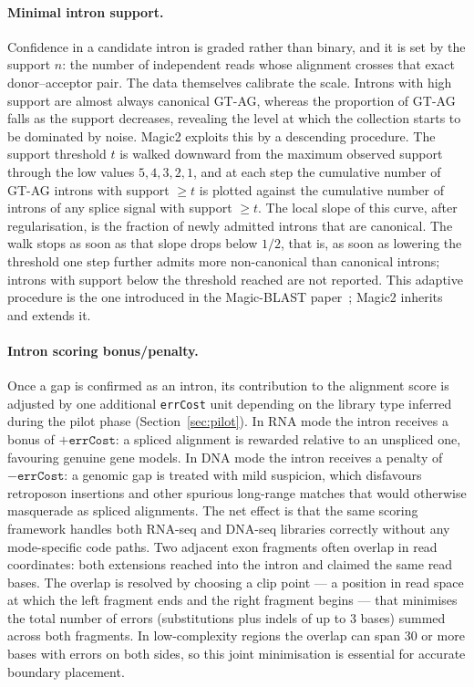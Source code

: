\documentclass[11pt]{article}
\begin{document}
\paragraph{Minimal intron support.}
Confidence in a candidate intron is graded rather than binary, and it
is set by the support $n$: the number of independent reads whose
alignment crosses that exact donor--acceptor pair.
The data themselves calibrate the scale.
Introns with high support are almost always canonical GT-AG, whereas
the proportion of GT-AG falls as the support decreases, revealing the
level at which the collection starts to be dominated by noise.
Magic2 exploits this by a descending procedure.
The support threshold $t$ is walked downward from the maximum observed
support through the low values $5, 4, 3, 2, 1$, and at each step the
cumulative number of GT-AG introns with support $\ge t$ is plotted
against the cumulative number of introns of any splice signal with
support $\ge t$.
The local slope of this curve, after regularisation, is the fraction
of newly admitted introns that are canonical.
The walk stops as soon as that slope drops below $1/2$, that is, as
soon as lowering the threshold one step further admits more
non-canonical than canonical introns; introns with support below the
threshold reached are not reported.
This adaptive procedure is the one introduced in the Magic-BLAST
paper~\citep{boratyn2019}; Magic2 inherits and extends it.

\paragraph{Intron scoring bonus/penalty.}
Once a gap is confirmed as an intron, its contribution to the
alignment score is adjusted by one additional \texttt{errCost} unit
depending on the library type inferred during the pilot phase
(Section~\ref{sec:pilot}).
In RNA mode the intron receives a bonus of $+\texttt{errCost}$:
a spliced alignment is rewarded relative to an unspliced one,
favouring genuine gene models.
In DNA mode the intron receives a penalty of $-\texttt{errCost}$:
a genomic gap is treated with mild suspicion, which disfavours
retroposon insertions and other spurious long-range matches that
would otherwise masquerade as spliced alignments.
The net effect is that the same scoring framework handles both
RNA-seq and DNA-seq libraries correctly without any mode-specific
code paths.
Two adjacent exon fragments often overlap in read coordinates: both
extensions reached into the intron and claimed the same read bases.
The overlap is resolved by choosing a clip point --- a position in
read space at which the left fragment ends and the right fragment
begins --- that minimises the total number of errors (substitutions
plus indels of up to 3 bases) summed across both fragments.
In low-complexity regions the overlap can span 30 or more bases
with errors on both sides, so this joint minimisation is essential
for accurate boundary placement.
\end{document}

